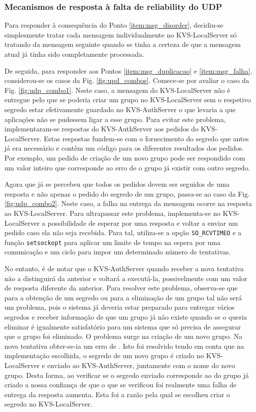 \subsubsection{Mecanismos de resposta à falta de reliability do UDP} \label{sec:reliability_udp}

Para responder à consequência do Ponto \ref{item:msg_disorder}, decidiu-se simplesmente tratar cada mensagem individualmente no KVS-LocalServer só tratando da mensagem seguinte quando se tinha a certeza de que a mensagem atual já tinha sido completamente processada.

De seguida, para responder aos Pontos \ref{item:msg_duplicacao} e \ref{item:msg_falha}, considerou-se os casos da Fig. \ref{fig:upd_combos}. Comece-se por avaliar o caso da Fig. \ref{fig:udp_combo1}. Neste caso, a mensagem do KVS-LocalServer não é entregue pelo que se poderia criar um grupo no KVS-LocalServer sem o respetivo segredo estar efetivamente guardado no KVS-AuthServer o que levaria a que aplicações não se pudessem ligar a esse grupo. Para evitar este problema, implementaram-se respostas do KVS-AuthServer aos pedidos do KVS-LocalServer. Estas respostas fundem-se com o fornecimento do segredo que antes já era necessário e contêm um código para os diferentes resultados dos pedidos. Por exemplo, um pedido de criação de um novo grupo pode ser respondido com um valor inteiro que corresponde ao erro de o grupo já existir com outro segredo.

Agora que já se percebeu que todos os pedidos devem ser seguidos de uma resposta e não apenas o pedido do segredo de um grupo, passa-se ao caso da Fig. \ref{fig:udp_combo2}. Neste caso, a falha na entrega da mensagem ocorre na resposta ao KVS-LocalServer. Para ultrapassar este problema, implementa-se no KVS-LocalServer a possibilidade de esperar por uma resposta e voltar a enviar um pedido caso ela não seja recebida. Para tal, utiliza-se a opção \texttt{SO\_RCVTIMEO} e a função \texttt{setsockopt} para aplicar um limite de tempo na espera por uma comunicação e um ciclo para impor um determinado número de tentativas. 

No entanto, é de notar que o KVS-AuthServer quando receber a nova tentativa não a distinguirá da anterior e voltará a executá-la, possivelmente com um valor de resposta diferente da anterior. Para resolver este problema, observa-se que para a obtenção de um segredo ou para a eliminação de um grupo tal não será um problema, pois o sistema já deveria estar preparado para entregar vários segredos e receber informação de que um grupo já não existe quando se o queria eliminar é igualmente satisfatório para um sistema que só precisa de assegurar que o grupo foi eliminado. O problema surge na criação de um novo grupo. Na nova tentativa obter-se-ia um erro de . Isto foi resolvido tendo em conta que na implementação escolhida, o segredo de um novo grupo é criado no KVS-LocalServer e enviado ao KVS-AuthServer, juntamente com o nome do novo grupo. Desta forma, ao verificar se o segredo enviado corresponde ao do grupo já criado a nossa confiança de que o que se verificou foi realmente uma falha de entrega da resposta aumenta. Esta foi a razão pela qual se escolheu criar o segredo no KVS-LocalServer.


